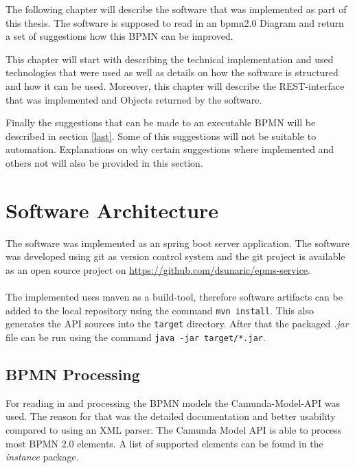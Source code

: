 \label{chapter-4}
The following chapter will describe the software that was implemented as part of this thesis. The software is supposed to read in an \gls{bpmn}2.0 Diagram and return a set of suggestions how this BPMN can be improved.

This chapter will start with describing the technical implementation and used technologies that were used as well as details on how the software is structured and how it can be used. 
Moreover, this chapter will describe the REST-interface that was implemented and Objects returned by the software. 

Finally the suggestions that can be made to an executable BPMN will be described in section \ref{last}. Some of this suggestions will not be suitable to automation. Explanations on why certain suggestions where implemented and others not will also be provided in this section.
\section{Software Architecture}
The software was implemented as an spring boot server\cite{spring-boot} application. The software was developed using git\cite{git} as version control system and the git project is available as an open source project on \url{https://github.com/dsunaric/epms-service}.\\~\\

The implemented uses maven\cite{maven} as a build-tool, therefore software artifacts can be added to the local repository using the command \verb|mvn install|. This also generates the API sources into the \verb|target| directory. After that the packaged \textit{.jar} file can be run using the command \verb|java -jar target/*.jar|. 


\subsection{BPMN Processing}
For reading in and processing the BPMN models the Camunda-Model-API\cite{camunda-model-api} was used. The reason for that was the detailed documentation and better usability compared to using an XML parser. The Camunda Model API is able to process most BPMN 2.0 elements. A list of supported elements can be found in the \textit{instance} package\cite{camunda-model-api-spoorted-elements}.
